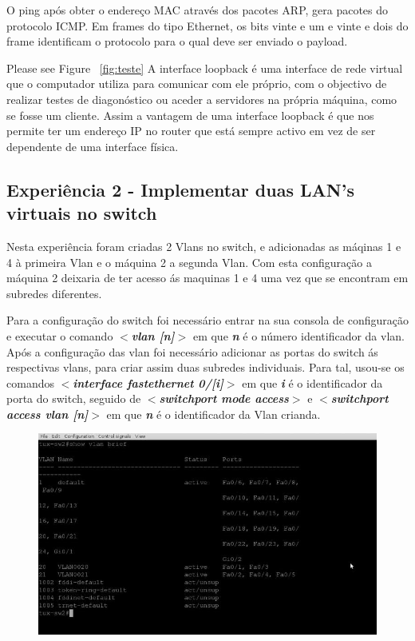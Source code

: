 \documentclass[a4paper]{article}
\begin{document}
O ping após obter o endereço MAC através dos pacotes ARP, gera pacotes do protocolo ICMP. Em frames do tipo Ethernet, os bits vinte e um e vinte e dois do frame identificam o protocolo para o qual deve ser enviado o payload.

\pagebreak

Please see Figure ~\autoref{fig:teste}
A interface loopback é uma interface de rede virtual que o computador utiliza para comunicar com ele próprio, com o objectivo de realizar testes de diagonóstico ou aceder a servidores na própria máquina, como se fosse um cliente. Assim a vantagem de uma interface loopback é que nos permite ter um endereço IP no router que está sempre activo em vez de ser dependente de uma interface física.

\subsection{Experiência 2 - Implementar duas LAN's virtuais no switch}
Nesta experiência foram criadas 2 Vlans no switch, e adicionadas as máqinas 1 e 4 à primeira Vlan e o máquina 2 a segunda Vlan. Com esta configuração a máquina 2 deixaria de ter acesso ás maquinas 1 e 4 uma vez que se encontram em subredes diferentes.


Para a configuração do switch foi necessário entrar na sua consola de configuração e executar o comando \textbf{\textit{$<$vlan [n]$>$}} em que \textbf{\textit{n}} é o número identificador da vlan. Após a configuração das vlan foi necessário adicionar as portas do switch ás respectivas vlans, para criar assim duas subredes individuais. Para tal, usou-se os comandos \textbf{\textit{$<$interface fastethernet 0/[i]$>$}} em que \textbf{\textit{i}} é o identificador da porta do switch, seguido de \textbf{\textit{$<$switchport mode access$>$}} e \textbf{\textit{$<$switchport access vlan [n]$>$}} em que \textit{\textbf{n}} é o identificador da Vlan crianda.

\begin{figure}[h!]
\centering
\includegraphics[scale=0.3]{res/image3.jpg}
\end{figure}
\end{document}
